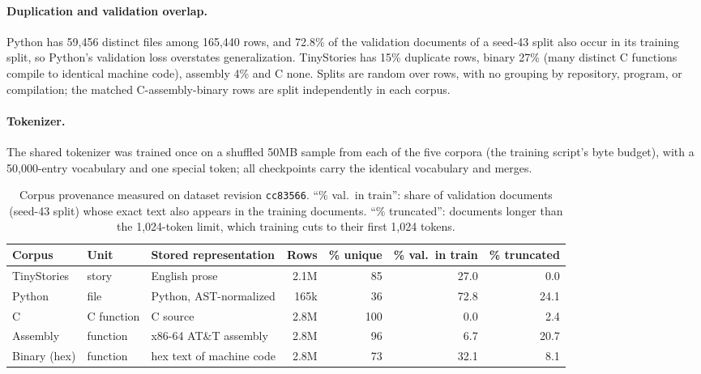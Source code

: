 \documentclass[mlmain]{jmlr}
\begin{document}
\paragraph{Duplication and validation overlap.} Python has 59,456 distinct files among 165,440 rows, and 72.8\% of the validation documents of a seed-43 split also occur in its training split, so Python's validation loss overstates generalization. TinyStories has 15\% duplicate rows, binary 27\% (many distinct C functions compile to identical machine code), assembly 4\% and C none. Splits are random over rows, with no grouping by repository, program, or compilation; the matched C-assembly-binary rows are split independently in each corpus.

\paragraph{Tokenizer.} The shared tokenizer was trained once on a shuffled 50MB sample from each of the five corpora (the training script's byte budget), with a 50,000-entry vocabulary and one special token; all checkpoints carry the identical vocabulary and merges.

\begin{table}[htbp]
  \centering
  \caption{Corpus provenance measured on dataset revision \texttt{cc83566}. ``\% val.\ in train'': share of validation documents (seed-43 split) whose exact text also appears in the training documents. ``\% truncated'': documents longer than the 1,024-token limit, which training cuts to their first 1,024 tokens.}
  \label{tab:provenance}
  \scriptsize
  \setlength{\tabcolsep}{3pt}
  \begin{tabular}{lllrrrr}
\toprule
Corpus & Unit & Stored representation & Rows & \% unique & \% val.\ in train & \% truncated \\
\midrule
TinyStories & story & English prose & 2.1M & 85 & 27.0 & 0.0 \\
Python & file & Python, AST-normalized & 165k & 36 & 72.8 & 24.1 \\
C & C function & C source & 2.8M & 100 & 0.0 & 2.4 \\
Assembly & function & x86-64 AT\&T assembly & 2.8M & 96 & 6.7 & 20.7 \\
Binary (hex) & function & hex text of machine code & 2.8M & 73 & 32.1 & 8.1 \\
\bottomrule
\end{tabular}
\end{table}
\end{document}
